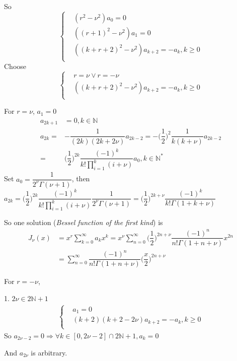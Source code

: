\documentclass{beamer}
\begin{document}
\begin{frame}

So
$$
\left\{
\begin{aligned}
&(r^2-\nu^2)a_0=0\\
&((r+1)^2-\nu^2)a_1=0\\
&((k+r+2)^2-\nu^2)a_{k+2}=-a_k,k\geqslant0\\
\end{aligned}
\right.$$
Choose
$$\left\{
\begin{aligned}
&r=\nu\vee r=-\nu\\
&((k+r+2)^2-\nu^2)a_{k+2}=-a_k,k\geqslant0\\
\end{aligned}
\right.
$$
\end{frame}
\begin{frame}
For $r=\nu$, $a_1=0$
\begin{align*}
a_{2k+1}&=0,k\in\mathbb{N}\\
a_{2k}=&-\dfrac{1}{(2k)(2k+2\nu)}a_{2k-2}=-\Big(\dfrac{1}{2}\Big)^2\dfrac{1}{k(k+\nu)}a_{2k-2}\\
=&\Big(\dfrac{1}{2}\Big)^{2k}\dfrac{(-1)^k}{k!\prod\limits_{i=1}^k(i+\nu)}a_0,k\in\mathbb{N}^*
\end{align*}
Set $a_0=\dfrac{1}{2^{\nu}\Gamma(\nu+1)}$, then $a_{2k}=\Big(\dfrac{1}{2}\Big)^{2k}\dfrac{(-1)^k}{k!\prod\limits_{i=1}^k(i+\nu)}\dfrac{1}{2^{\nu}\Gamma(\nu+1)}=\Big(\dfrac{1}{2}\Big)^{2k+\nu}\dfrac{(-1)^k}{k!\Gamma(1+k+\nu)}$

\end{frame}

\begin{frame}
So one solution (\textit{Bessel function of the first kind}) is
\begin{align*}
J_{\nu}(x)&=x^{r}\sum\limits_{k=0}^{\infty}a_{k}x^k=x^{\nu}\sum\limits_{n=0}^{\infty}\Big(\dfrac{1}{2}\Big)^{2n+\nu}\dfrac{(-1)^n}{n!\Gamma(1+n+\nu)}x^{2n}\\
&=\sum\limits_{n=0}^{\infty}\dfrac{(-1)^n}{n!\Gamma(1+n+\nu)}\Big(\dfrac{x}{2}\Big)^{2n+\nu}
\end{align*}


\end{frame}


\begin{frame}
For $r=-\nu$, 

\begin{block}{1. $2\nu\in2\mathbb{N}+1$}
\begin{align*}
\left\{
\begin{aligned}
&a_1=0\\
&(k+2)(k+2-2\nu)a_{k+2}=-a_k,k\geqslant0\\
\end{aligned}
\right.
\end{align*}
So $a_{2\nu-2}=0\Rightarrow \forall k\in[0,2\nu-2]\cap2\mathbb{N}+1, a_k=0$ 

And $a_{2\nu}$ is arbitrary.
\end{block}

\end{frame}
\end{document}
